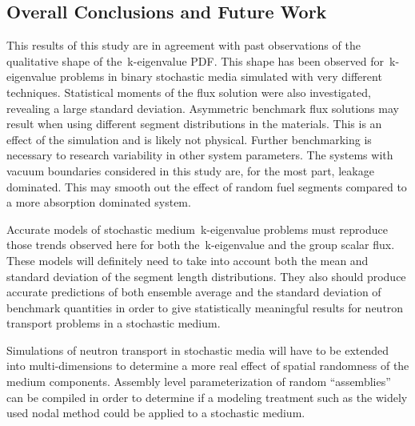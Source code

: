\subsection{Overall Conclusions and Future Work}
\label{sec:Conclusions-over}

\noindent
	\indent This results of this study are in agreement with past observations of the qualitative
	shape of
	the~k-eigenvalue PDF.  This shape has been observed for~k-eigenvalue problems in 
	binary stochastic media simulated with very different techniques.  Statistical moments
	of the flux solution were also investigated, revealing a large standard deviation.
	Asymmetric benchmark flux solutions may result when using different segment distributions
	in the materials.  This is an effect of the simulation and is likely not physical.  
	Further benchmarking is necessary to research variability in other system parameters.
	The systems with vacuum boundaries considered in this study are, for the most part, leakage
	dominated.  This may smooth out the effect of random fuel segments compared to a more
	absorption dominated system.
	
	
\noindent
	\indent Accurate models of stochastic medium~k-eigenvalue problems must reproduce
	those trends observed here for both the~k-eigenvalue and the group scalar flux.  These models
	will definitely need to take into account both the mean and standard deviation of the 
	segment length distributions. They also should produce accurate predictions of both
	ensemble average and the standard deviation of benchmark quantities in order to 
	give statistically meaningful results for neutron transport problems in a stochastic medium.

\noindent
	\indent Simulations of neutron transport in stochastic media will have to be extended into 
	multi-dimensions to determine a more real effect of spatial randomness of the medium
	components.  Assembly level parameterization of random ``assemblies'' can be compiled in
	order to determine if a modeling treatment such as the widely used nodal method could 
	be applied to a stochastic medium.  










